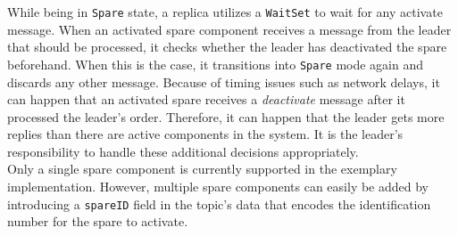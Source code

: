 While being in \texttt{Spare} state, a replica utilizes a \texttt{WaitSet} to wait for any activate message.
When an activated spare component receives a message from the leader that should be processed, it checks whether the leader has deactivated the spare beforehand.
When this is the case, it transitions into \texttt{Spare} mode again and discards any other message.
Because of timing issues such as network delays, it can happen that an activated spare receives a \textit{deactivate} message after it processed the leader's order.
Therefore, it can happen that the leader gets more replies than there are active components in the system.
It is the leader's responsibility to handle these additional decisions appropriately.
\\

Only a single spare component is currently supported in the exemplary implementation.
However, multiple spare components can easily be added by introducing a \texttt{spareID} field in the topic's data that encodes the identification number for the spare to activate.

